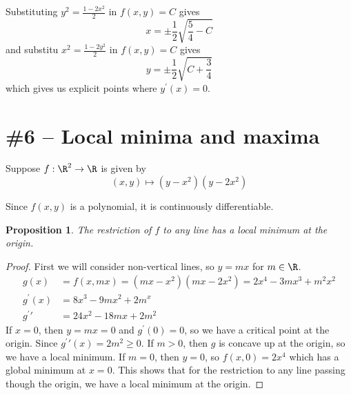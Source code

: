 \documentclass[letterpaper,11pt]{article}
\newtheorem{prop}{Proposition}
\newcommand{\pprime}{\prime\prime}
\begin{document}
Substituting $y^2 = \frac{1 - 2x^2}{2}$ in $f(x, y) = C$ gives
\begin{equation*}
    x = \pm \frac{1}{2} \sqrt{\frac{5}{4} - C}
\end{equation*}
and substitu $x^2 = \frac{1 - 2y^2}{2}$ in $f(x, y) = C$ gives
\begin{equation*}
    y = \pm \frac{1}{2} \sqrt{C + \frac{3}{4}}
\end{equation*}
which gives us explicit points where $y^\prime(x) = 0$.

\section*{\#6 -- Local minima and maxima}

Suppose $f : \R^2 \to \R$ is given by
\begin{equation*}
    (x, y) \mapsto (y - x^2)(y - 2x^2)
\end{equation*}

Since $f(x, y)$ is a polynomial, it is continuously differentiable.

\begin{prop}
    The restriction of $f$ to any line has a local minimum at the origin.
\end{prop}

\begin{proof}
    First we will consider non-vertical lines, so $y = mx$ for $m \in \R$.
    \begin{align*}
        g(x) &= f(x, mx) = (mx - x^2)(mx - 2x^2) = 2x^4 - 3mx^3 + m^2x^2 \\
        g^\prime(x) &= 8x^3 - 9mx^2 + 2m^x \\
        g^\pprime &= 24x^2 - 18mx + 2m^2
    \end{align*}
    If $x = 0$, then $y = mx = 0$ and $g^\prime(0) = 0$, so we have a critical
    point at the origin. Since $g^\pprime(x) = 2m^2 \geq 0$. If $m > 0$, then
    $g$ is concave up at the origin, so we have a local minimum. If $m=0$, then
    $y = 0$, so $f(x, 0) = 2x^4$ which has a global minimum at $x = 0$.
    This shows that for the restriction to any line passing though the origin,
    we have a local minimum at the origin.
\end{proof}
\end{document}
